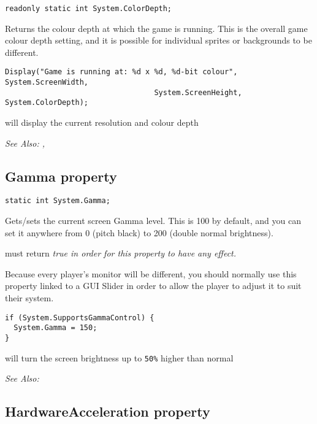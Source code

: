 \begin{verbatim}
readonly static int System.ColorDepth;
\end{verbatim}
Returns the colour depth at which the game is running. This is the overall game colour depth setting,
and it is possible for individual sprites or backgrounds to be different.

\begin{verbatim}
Display("Game is running at: %d x %d, %d-bit colour", System.ScreenWidth,
                                  System.ScreenHeight, System.ColorDepth);
\end{verbatim}
will display the current resolution and colour depth

\it{See Also:} ,


\subsection{Gamma property}\label{System.Gamma}%

\begin{verbatim}
static int System.Gamma;
\end{verbatim}
Gets/sets the current screen Gamma level. This is 100 by default, and you can set it anywhere from 0 (pitch black)
to 200 (double normal brightness).

 must return \it{true}
in order for this property to have any effect.

Because every player's monitor will be different, you should normally use this property linked to a GUI Slider
in order to allow the player to adjust it to suit their system.

\begin{verbatim}
if (System.SupportsGammaControl) {
  System.Gamma = 150;
}
\end{verbatim}
will turn the screen brightness up to \verb$50%$ higher than normal

\it{See Also:} 


\subsection{HardwareAcceleration property}\label{System.HardwareAcceleration}%

